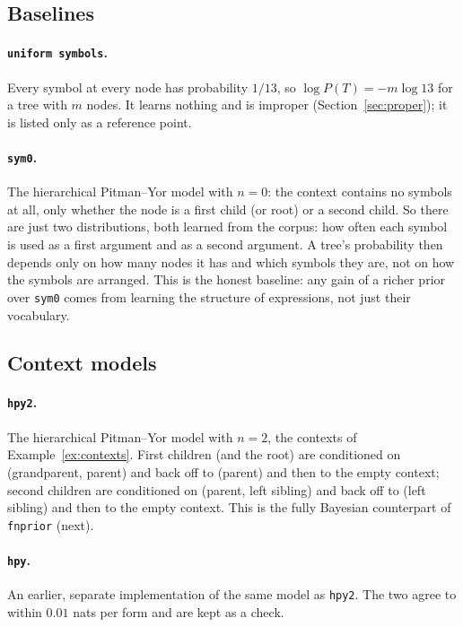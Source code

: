 \documentclass[11pt]{article}
\begin{document}
\subsection{Baselines}

\paragraph{\texttt{uniform symbols}.} Every symbol at every node has probability $1/13$, so
$\log P(T) = -m \log 13$ for a tree with $m$ nodes. It learns nothing and is improper
(Section~\ref{sec:proper}); it is listed only as a reference point.

\paragraph{\texttt{sym0}.} The hierarchical Pitman--Yor model with $n=0$: the context contains no
symbols at all, only whether the node is a first child (or root) or a second child. So there are just two
distributions, both learned from the corpus: how often each symbol is used as a first argument and as a
second argument. A tree's probability then depends only on how many nodes it has and which symbols they
are, not on how the symbols are arranged. This is the honest baseline: any gain of a richer prior over
\texttt{sym0} comes from learning the structure of expressions, not just their vocabulary.

\subsection{Context models}

\paragraph{\texttt{hpy2}.} The hierarchical Pitman--Yor model with $n=2$, the contexts of
Example~\ref{ex:contexts}. First children (and the root) are conditioned on (grandparent, parent) and
back off to (parent) and then to the empty context; second children are conditioned on (parent, left
sibling) and back off to (left sibling) and then to the empty context. This is the fully Bayesian
counterpart of \texttt{fnprior} (next).

\paragraph{\texttt{hpy}.} An earlier, separate implementation of the same model as \texttt{hpy2}. The two
agree to within $0.01$ nats per form and are kept as a check.
\end{document}
